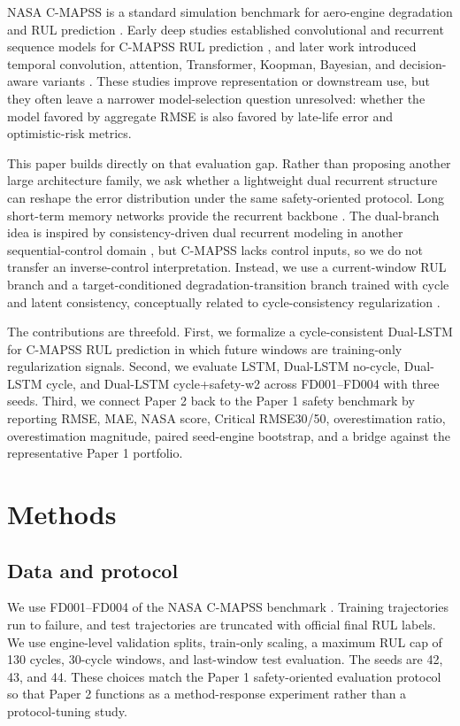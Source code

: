 \documentclass[10pt,twocolumn]{article}
\begin{document}
NASA C-MAPSS is a standard simulation benchmark for aero-engine degradation and RUL prediction \citep{NASA_PCoE,Saxena2008}. Early deep studies established convolutional and recurrent sequence models for C-MAPSS RUL prediction \citep{Babu2016,Zheng2017,Li2018}, and later work introduced temporal convolution, attention, Transformer, Koopman, Bayesian, and decision-aware variants \citep{Liu2023SAETCN,Fan2024STAR,Kim2025KoopmanTransformer,Hu2023Bayesian,Xiang2024BayesianGated,DePater2022,Mitici2023}. These studies improve representation or downstream use, but they often leave a narrower model-selection question unresolved: whether the model favored by aggregate RMSE is also favored by late-life error and optimistic-risk metrics.

This paper builds directly on that evaluation gap. Rather than proposing another large architecture family, we ask whether a lightweight dual recurrent structure can reshape the error distribution under the same safety-oriented protocol. Long short-term memory networks provide the recurrent backbone \citep{Hochreiter1997,Zheng2017}. The dual-branch idea is inspired by consistency-driven dual recurrent modeling in another sequential-control domain \citep{DualLSTMSoftRobot2026}, but C-MAPSS lacks control inputs, so we do not transfer an inverse-control interpretation. Instead, we use a current-window RUL branch and a target-conditioned degradation-transition branch trained with cycle and latent consistency, conceptually related to cycle-consistency regularization \citep{Zhu2017CycleGAN}.

The contributions are threefold. First, we formalize a cycle-consistent Dual-LSTM for C-MAPSS RUL prediction in which future windows are training-only regularization signals. Second, we evaluate LSTM, Dual-LSTM no-cycle, Dual-LSTM cycle, and Dual-LSTM cycle+safety-w2 across FD001--FD004 with three seeds. Third, we connect Paper 2 back to the Paper 1 safety benchmark by reporting RMSE, MAE, NASA score, Critical RMSE30/50, overestimation ratio, overestimation magnitude, paired seed-engine bootstrap, and a bridge against the representative Paper 1 portfolio.

\section{Methods}
\subsection{Data and protocol}
We use FD001--FD004 of the NASA C-MAPSS benchmark \citep{NASA_PCoE,Saxena2008}. Training trajectories run to failure, and test trajectories are truncated with official final RUL labels. We use engine-level validation splits, train-only scaling, a maximum RUL cap of 130 cycles, 30-cycle windows, and last-window test evaluation. The seeds are 42, 43, and 44. These choices match the Paper 1 safety-oriented evaluation protocol so that Paper 2 functions as a method-response experiment rather than a protocol-tuning study.
\end{document}
